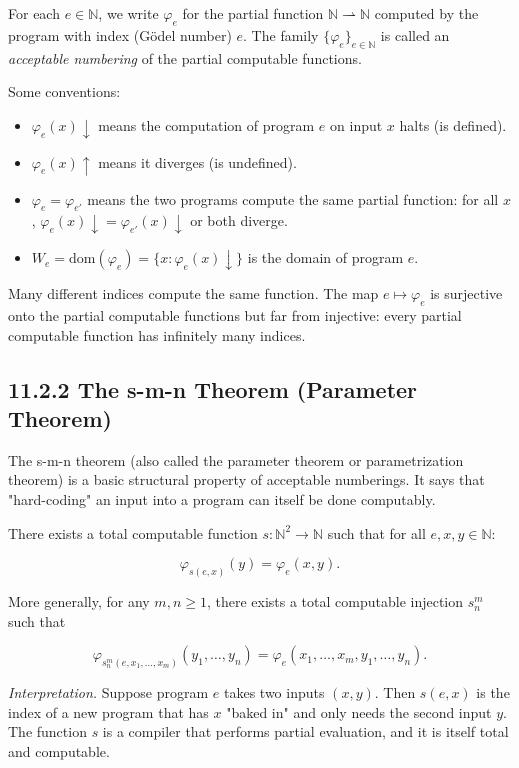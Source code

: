 \begin{definition}
For each $e \in \mathbb{N}$, we write $\varphi_e$ for the partial function $\mathbb{N} \rightharpoonup \mathbb{N}$ computed by the program with index (Gödel number) $e$. The family $\{ \varphi_e\} _{e \in \mathbb{N}}$ is called an \textit{acceptable numbering} of the partial computable functions.

Some conventions:

\begin{itemize}
\item $\varphi_e(x)\!\downarrow$ means the computation of program $e$ on input $x$ halts (is defined).
\item $\varphi_e(x)\!\uparrow$ means it diverges (is undefined).
\item $\varphi_e = \varphi_{e'}$ means the two programs compute the same partial function: for all $x$, $\varphi_e(x)\!\downarrow = \varphi_{e'}(x)\!\downarrow$ or both diverge.
\item $W_e = \text{dom}(\varphi_e) = \{ x : \varphi_e(x)\!\downarrow\} $ is the domain of program $e$.
\end{itemize}
\end{definition}

\begin{remark}
Many different indices compute the same function. The map $e \mapsto \varphi_e$ is surjective onto the partial computable functions but far from injective: every partial computable function has infinitely many indices.
\end{remark}

\subsection{11.2.2 The s-m-n Theorem (Parameter Theorem)}

The s-m-n theorem (also called the parameter theorem or parametrization theorem) is a basic structural property of acceptable numberings. It says that "hard-coding" an input into a program can itself be done computably.

\begin{theorem}
There exists a total computable function $s: \mathbb{N}^2 \to \mathbb{N}$ such that for all $e, x, y \in \mathbb{N}$:

\[\varphi_{s(e, x)}(y) = \varphi_e(x, y).\]

More generally, for any $m, n \geq 1$, there exists a total computable injection $s^m_n$ such that

\[\varphi_{s^m_n(e, x_1, \ldots, x_m)}(y_1, \ldots, y_n) = \varphi_e(x_1, \ldots, x_m, y_1, \ldots, y_n).\]

\textit{Interpretation.} Suppose program $e$ takes two inputs $(x, y)$. Then $s(e, x)$ is the index of a new program that has $x$ "baked in" and only needs the second input $y$. The function $s$ is a compiler that performs partial evaluation, and it is itself total and computable.
\end{theorem}

